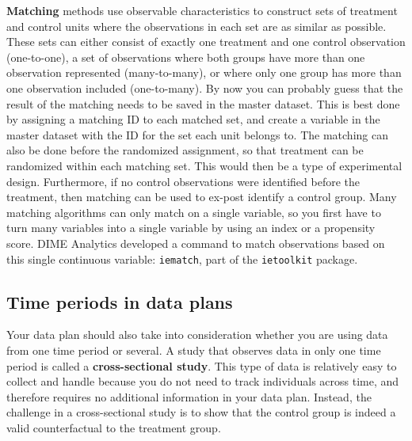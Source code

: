 
\textbf{Matching}
methods use observable characteristics to construct
sets of treatment and control units
where the observations in each set 
are as similar as possible. 
These sets can either consist of exactly one treatment and one control observation (one-to-one),
a set of observations where
both groups have more than one observation represented (many-to-many),
or where only one group has more than one observation included (one-to-many).
By now you can probably guess that 
the result of the matching needs to be saved in the master dataset.
This is best done by assigning a matching ID to each matched set, 
and create a variable in the master dataset 
with the ID for the set each unit belongs to.
The matching can also be done before the randomized assignment,
so that treatment can be randomized within each matching set.
This would then be a type of experimental design.
Furthermore, if no control observations were identified before the treatment,
then matching can be used to ex-post identify a control group.
Many matching algorithms can only match on a single variable,
so you first have to turn many variables into a single variable
by using an index or a propensity score.
DIME Analytics developed a command to match observations 
based on this single continuous variable: \texttt{iematch},
part of the \texttt{ietoolkit} package.

\subsection{Time periods in data plans}

Your data plan should also take into consideration 
whether you are using data from one time period or several.
A study that observes data in only one time period is called
a \textbf{cross-sectional study}.
This type of data is relatively easy to collect and handle because
you do not need to track individuals across time,
and therefore requires no additional information in your data plan.
Instead, the challenge in a cross-sectional study is to
show that the control group is indeed a valid counterfactual to the treatment group.

